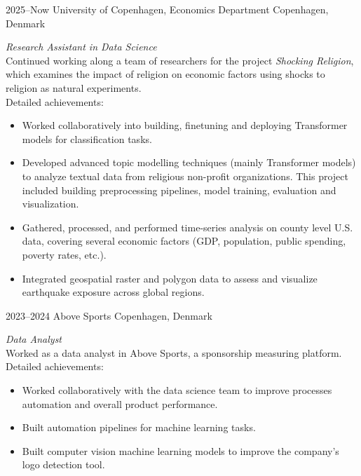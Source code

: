 \documentclass[]{friggeri-cv-a4}
\begin{document}
\begin{entrylist}


\entry
{2025--Now}
{University of Copenhagen, Economics Department}
{Copenhagen, Denmark}
{\emph{Research Assistant in Data Science} \\
Continued working along a team of researchers for the project \emph{Shocking Religion}, which examines the impact of religion on economic factors using shocks to religion as natural experiments. \\
Detailed achievements:
\begin{itemize}
\item Worked collaboratively into building, finetuning and deploying Transformer models for classification tasks.
\item Developed advanced topic modelling techniques (mainly Transformer models) to analyze textual data from religious non-profit organizations. This project included building preprocessing pipelines, model training, evaluation and visualization.
\item Gathered, processed, and performed time-series analysis on county level U.S. data, covering several economic factors (GDP, population, public spending, poverty rates, etc.).
\item Integrated geospatial raster and polygon data to assess and visualize earthquake exposure across global regions.
\end{itemize}}


\entry
{2023--2024}
{Above Sports}
{Copenhagen, Denmark}
{\emph{Data Analyst} \\
Worked as a data analyst in Above Sports, a sponsorship measuring platform.
Detailed achievements:
\begin{itemize}
\item Worked collaboratively with the data science team to improve processes automation and overall product performance.
\item Built automation pipelines for machine learning tasks.
\item Built computer vision machine learning models to improve the company's logo detection tool.
\end{itemize}}


\end{entrylist}
\end{document}
